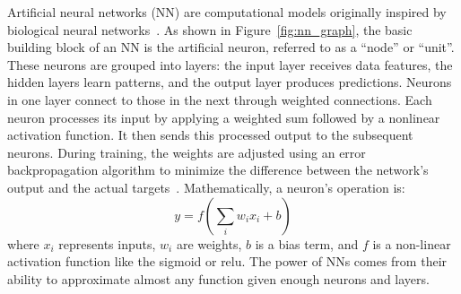 Artificial neural networks (NN) are computational models originally inspired by biological neural networks~\citep{mcculloch1943logical,rosenblatt1958perceptron}. As shown in Figure~\ref{fig:nn_graph}, the basic building block of an NN is the artificial neuron, referred to as a ``node'' or ``unit''. These neurons are grouped into layers: the input layer receives data features, the hidden layers learn patterns, and the output layer produces predictions. Neurons in one layer connect to those in the next through weighted connections. Each neuron processes its input by applying a weighted sum followed by a nonlinear activation function. It then sends this processed output to the subsequent neurons. During training, the weights are adjusted using an error backpropagation algorithm to minimize the difference between the network's output and the actual targets~\citep{rumelhart1985learning}. Mathematically, a neuron's operation is:
\begin{equation}
    y = f\left( \sum_i w_i x_i + b \right)
\end{equation}
\noindent where $x_i$ represents inputs, $w_i$ are weights, $b$ is a bias term, and $f$ is a non-linear activation function like the sigmoid or relu. The power of NNs comes from their ability to approximate almost any function given enough neurons and layers.


